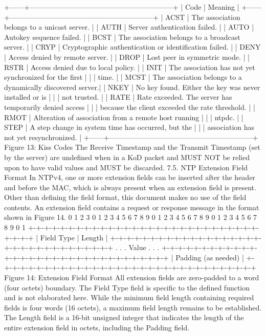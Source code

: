  +------+------------------------------------------------------------+
 | Code | Meaning |
 +------+------------------------------------------------------------+
 | ACST | The association belongs to a unicast server. |
 | AUTH | Server authentication failed. |
 | AUTO | Autokey sequence failed. |
 | BCST | The association belongs to a broadcast server. |
 | CRYP | Cryptographic authentication or identification failed. |
 | DENY | Access denied by remote server. |
 | DROP | Lost peer in symmetric mode. |
 | RSTR | Access denied due to local policy. |
 | INIT | The association has not yet synchronized for the first |
 | | time. |
 | MCST | The association belongs to a dynamically discovered server.|
 | NKEY | No key found. Either the key was never installed or is |
 | | not trusted. |
 | RATE | Rate exceeded. The server has temporarily denied access |
 | | because the client exceeded the rate threshold. |
 | RMOT | Alteration of association from a remote host running |
 | | ntpdc. |
 | STEP | A step change in system time has occurred, but the |
 | | association has not yet resynchronized. |
 +------+------------------------------------------------------------+
 Figure 13: Kiss Codes
 The Receive Timestamp and the Transmit Timestamp (set by the server)
 are undefined when in a KoD packet and MUST NOT be relied upon to
 have valid values and MUST be discarded.
7.5. NTP Extension Field Format
 In NTPv4, one or more extension fields can be inserted after the
 header and before the MAC, which is always present when an extension
 field is present. Other than defining the field format, this
 document makes no use of the field contents. An extension field
 contains a request or response message in the format shown in
 Figure 14.
 0 1 2 3
 0 1 2 3 4 5 6 7 8 9 0 1 2 3 4 5 6 7 8 9 0 1 2 3 4 5 6 7 8 9 0 1
 +-+-+-+-+-+-+-+-+-+-+-+-+-+-+-+-+-+-+-+-+-+-+-+-+-+-+-+-+-+-+-+-+
 | Field Type | Length |
 +-+-+-+-+-+-+-+-+-+-+-+-+-+-+-+-+-+-+-+-+-+-+-+-+-+-+-+-+-+-+-+-+
 . .
 . Value .
 . .
 +-+-+-+-+-+-+-+-+-+-+-+-+-+-+-+-+-+-+-+-+-+-+-+-+-+-+-+-+-+-+-+-+
 | Padding (as needed) |
 +-+-+-+-+-+-+-+-+-+-+-+-+-+-+-+-+-+-+-+-+-+-+-+-+-+-+-+-+-+-+-+-+
 Figure 14: Extension Field Format
 All extension fields are zero-padded to a word (four octets)
 boundary. The Field Type field is specific to the defined function
 and is not elaborated here. While the minimum field length
 containing required fields is four words (16 octets), a maximum field
 length remains to be established.
 The Length field is a 16-bit unsigned integer that indicates the
 length of the entire extension field in octets, including the Padding
 field.
